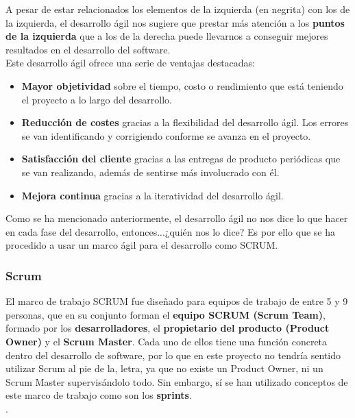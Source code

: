A pesar de estar relacionados los elementos de la izquierda (en negrita) con los de la
izquierda, el desarrollo ágil nos sugiere que prestar más atención a los \textbf{puntos
de la izquierda} que a los de la derecha puede llevarnos a conseguir mejores resultados
en el desarrollo del software.\\

Este desarrollo ágil ofrece una serie de ventajas \cite{advantages-agile-methodology}
destacadas:

    \begin{itemize}
        \item \textbf{Mayor objetividad} sobre el tiempo, costo o rendimiento que está
        teniendo el proyecto a lo largo del desarrollo.
        \item \textbf{Reducción de costes} gracias a la flexibilidad del desarrollo ágil.
        Los errores se van identificando y corrigiendo conforme se avanza en el proyecto.
        \item \textbf{Satisfacción del cliente} gracias a las entregas de producto
        periódicas que se van realizando, además de sentirse más involucrado con él.
        \item \textbf{Mejora continua} gracias a la iteratividad del desarrollo ágil. 
    \end{itemize}

Como se ha mencionado anteriormente, el desarrollo ágil no nos dice lo que hacer en cada fase
del desarrollo, entonces...¿quién nos lo dice? Es por ello que se ha procedido a usar un
marco ágil para el desarrollo como SCRUM.\\

\subsubsection{Scrum} \label{subsubsec:scrum}
El marco de trabajo SCRUM \cite{scrum} fue diseñado para equipos de trabajo de entre 5 y 9
personas, que en su conjunto forman el \textbf{equipo SCRUM (Scrum Team)}, formado por los
\textbf{desarrolladores}, el \textbf{propietario del producto (Product Owner)} y el
\textbf{Scrum Master}. Cada uno de ellos tiene una función concreta dentro del desarrollo
de software, por lo que en este proyecto no tendría sentido utilizar Scrum al pie de la,
letra, ya que no existe un Product Owner, ni un Scrum Master supervisándolo todo. Sin
embargo, sí se han utilizado conceptos de este marco de trabajo como son los 
\textbf{sprints}.\\.

